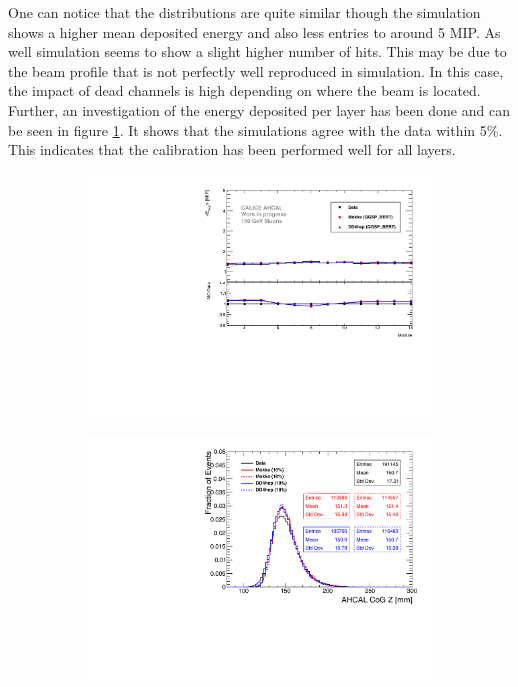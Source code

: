 One can notice that the distributions are quite similar though the simulation shows a higher mean deposited energy and also less entries to around 5 MIP. As well simulation seems to show a slight higher number of hits. This may be due to the beam profile that is not perfectly well reproduced in simulation. In this case, the impact of dead channels is high depending on where the beam is located. Further, an investigation of the energy deposited per layer has been done and can be seen in figure \ref{fig:muEdep}. It shows that the simulations agree with the data within 5\%. This indicates that the calibration has been performed well for all layers.

\begin{figure}[htbp!]
  \centering
  \begin{subfigure}[t]{0.49\textwidth}
    \includegraphics[width=1\linewidth]{chap5/fig_AHCAL_timing/Muons/ProfileMuons_Edep.pdf}
    \caption{} \label{fig:muEdep}
  \end{subfigure}
  \hfill
  \begin{subfigure}[t]{0.49\textwidth}
    \includegraphics[width=1.\linewidth]{chap5/fig_AHCAL_Timing/Electrons/Comparison_CoGZ_Xtalk_electrons10GeV.pdf}

\end{subfigure}
\end{figure}
